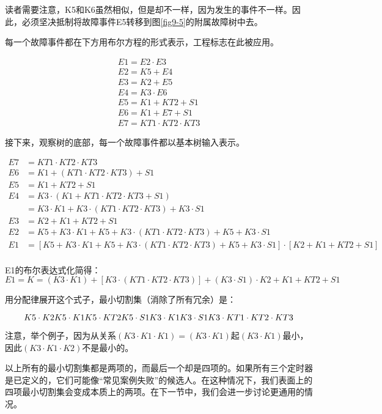\documentclass[cn,11pt,chinese]{elegantbook}
\begin{document}
{读者需要注意，K5和K6虽然相似，但是却不一样，因为发生的事件不一样。因此，必须坚决抵制将故障事件E5转移到图\ref{fig9-5}的附属故障树中去。

每一个故障事件都在下方用布尔方程的形式表示，工程标志在此被应用。

\begin{align*}
E1=E2\cdot E3   \\
E2=K5+E4    \\
E3=K2+E5    \\
E4=K3\cdot E6   \\
E5=K1+KT2+S1    \\
E6=K1+E7+S1 \\
E7=KT1\cdot KT2 \cdot KT3
\end{align*}

接下来，观察树的底部，每一个故障事件都以基本树输入表示。


\begin{align*}
E7 &=KT1\cdot KT2\cdot KT3    \\
E6 &=K1+(KT1\cdot KT2\cdot KT3)+S1    \\
E5 &=K1+KT2+S1    \\
E4 &=K3\cdot (K1+KT1\cdot KT2\cdot KT3+S1)    \\
&=K3\cdot K1+K3\cdot (KT1\cdot KT2\cdot KT3)+K3\cdot S1 \\
E3&=K2+K1+KT2+S1 \\
E2&=K5+K3\cdot K1+K5+K3\cdot(KT1\cdot KT2\cdot KT3)+K5+K3\cdot S1    \\
E1&=[K5+K3\cdot K1+K5+K3\cdot(KT1\cdot KT2\cdot KT3)+K5+K3\cdot S1]\cdot[K2+K1+KT2+S1]\\
\end{align*}


E1的布尔表达式化简得：
$$
E1={K=(K3\cdot K1)+[K3\cdot (KT1\cdot KT2\cdot KT3)]+(K3\cdot S1)}\cdot{K2+K1+KT2+S1}
$$

用分配律展开这个式子，最小切割集（消除了所有冗余）是：

$$
K5\cdot K2  \\
K5\cdot K1  \\
K5\cdot KT2 \\
K5\cdot S1  \\
K3\cdot K1  \\
K3\cdot S1  \\
K3\cdot KT1 \cdot KT2 \cdot KT3
$$

注意，举个例子，因为从关系$(K3\cdot K1\cdot K1)=(K3\cdot K1)$起$(K3\cdot K1)$最小，因此$(K3\cdot K1\cdot K2)$不是最小的。

以上所有的最小切割集都是两项的，而最后一个却是四项的。如果所有三个定时器是已定义的，它们可能像“常见案例失败”的候选人。在这种情况下，我们表面上的四项最小切割集会变成本质上的两项。在下一节中，我们会进一步讨论更通用的情况。

}
\end{document}
